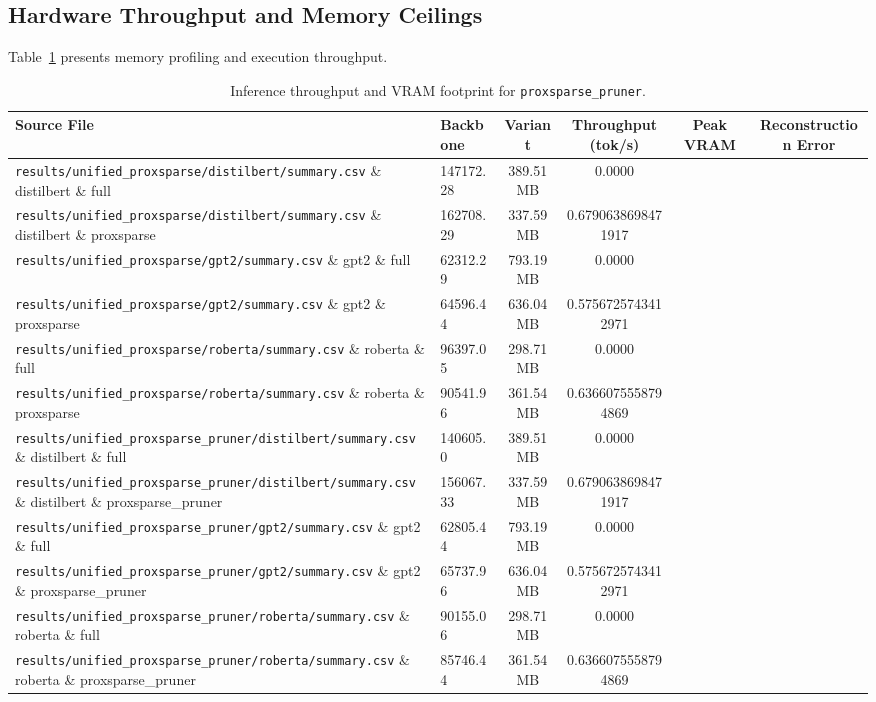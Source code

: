 \subsection{Hardware Throughput and Memory Ceilings}
Table~\ref{tab:results_vram_proxsparse\_pruner} presents memory profiling and execution throughput.

\begin{table}[t]
\centering
\small
\begin{tabularx}{\linewidth}{llcccc}
\toprule
\textbf{Source File} & \textbf{Backbone} & \textbf{Variant} & \textbf{Throughput (tok/s)} & \textbf{Peak VRAM} & \textbf{Reconstruction Error} \\
\midrule
\texttt{results/unified\_proxsparse/distilbert/summary.csv} \& distilbert \& full & 147172.28 & 389.51 MB & 0.0000 \\
\texttt{results/unified\_proxsparse/distilbert/summary.csv} \& distilbert \& proxsparse & 162708.29 & 337.59 MB & 0.6790638698471917 \\
\texttt{results/unified\_proxsparse/gpt2/summary.csv} \& gpt2 \& full & 62312.29 & 793.19 MB & 0.0000 \\
\texttt{results/unified\_proxsparse/gpt2/summary.csv} \& gpt2 \& proxsparse & 64596.44 & 636.04 MB & 0.5756725743412971 \\
\texttt{results/unified\_proxsparse/roberta/summary.csv} \& roberta \& full & 96397.05 & 298.71 MB & 0.0000 \\
\texttt{results/unified\_proxsparse/roberta/summary.csv} \& roberta \& proxsparse & 90541.96 & 361.54 MB & 0.6366075558794869 \\
\texttt{results/unified\_proxsparse\_pruner/distilbert/summary.csv} \& distilbert \& full & 140605.0 & 389.51 MB & 0.0000 \\
\texttt{results/unified\_proxsparse\_pruner/distilbert/summary.csv} \& distilbert \& proxsparse\_pruner & 156067.33 & 337.59 MB & 0.6790638698471917 \\
\texttt{results/unified\_proxsparse\_pruner/gpt2/summary.csv} \& gpt2 \& full & 62805.44 & 793.19 MB & 0.0000 \\
\texttt{results/unified\_proxsparse\_pruner/gpt2/summary.csv} \& gpt2 \& proxsparse\_pruner & 65737.96 & 636.04 MB & 0.5756725743412971 \\
\texttt{results/unified\_proxsparse\_pruner/roberta/summary.csv} \& roberta \& full & 90155.06 & 298.71 MB & 0.0000 \\
\texttt{results/unified\_proxsparse\_pruner/roberta/summary.csv} \& roberta \& proxsparse\_pruner & 85746.44 & 361.54 MB & 0.6366075558794869 \\
\bottomrule
\end{tabularx}
\caption{Inference throughput and VRAM footprint for \texttt{proxsparse\_pruner}.}
\label{tab:results_vram_proxsparse\_pruner}
\end{table}


